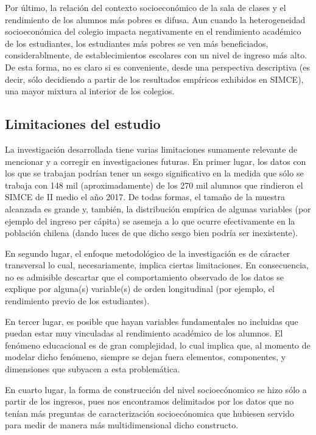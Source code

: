 \documentclass[
]{article}
\begin{document}
Por último, la relación del contexto socioeconómico de la sala de clases
y el rendimiento de los alumnos más pobres es difusa. Aun cuando la
heterogeneidad socioeconómica del colegio impacta negativamente en el
rendimiento académico de los estudiantes, los estudiantes más pobres se
ven más beneficiados, considerablmente, de establecimientos escolares
con un nivel de ingreso más alto. De esta forma, no es claro si es
conveniente, desde una perspectiva descriptiva (es decir, sólo
decidiendo a partir de los resultados empíricos exhibidos en SIMCE), una
mayor mixtura al interior de los colegios.

\hypertarget{limitaciones-del-estudio}{%
\subsection{Limitaciones del estudio}\label{limitaciones-del-estudio}}

La investigación desarrollada tiene varias limitaciones sumamente
relevante de mencionar y a corregir en investigaciones futuras. En
primer lugar, los datos con los que se trabajan podrían tener un sesgo
significativo en la medida que sólo se trabaja con 148 mil
(aproximadamente) de los 270 mil alumnos que rindieron el SIMCE de II
medio el año 2017. De todas formas, el tamaño de la muestra alcanzada es
grande y, también, la distribución empírica de algunas variables (por
ejemplo del ingreso per cápita) se asemeja a lo que ocurre efectivamente
en la población chilena (dando luces de que dicho sesgo bien podría ser
inexistente).

En segundo lugar, el enfoque metodológico de la investigación es de
cáracter transversal lo cual, necesariamente, implica ciertas
limitaciones. En consecuencia, no es admisible descartar que el
comportamiento observado de los datos se explique por alguna(s)
variable(s) de orden longitudinal (por ejemplo, el rendimiento previo de
los estudiantes).

En tercer lugar, es posible que hayan variables fundamentales no
incluidas que puedan estar muy vinculadas al rendimiento académico de
los alumnos. El fenómeno educacional es de gran complejidad, lo cual
implica que, al momento de modelar dicho fenómeno, siempre se dejan
fuera elementos, componentes, y dimensiones que subyacen a esta
problemática.

En cuarto lugar, la forma de construcción del nivel socioecónomico se
hizo sólo a partir de los ingresos, pues nos encontramos delimitados por
los datos que no tenían más preguntas de caracterización socioecónomica
que hubiesen servido para medir de manera más multidimensional dicho
constructo.
\end{document}
